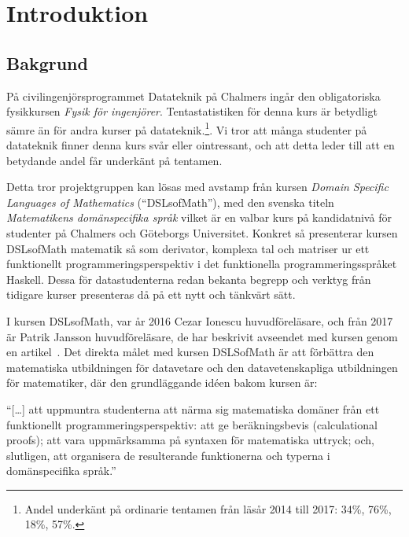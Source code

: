 
\chapter{Introduktion}

\begin{binge}
\end{binge}

\section{Bakgrund}

\begin{draft}

På civilingenjörsprogrammet Datateknik på Chalmers ingår den obligatoriska
fysikkursen \textit{Fysik för ingenjörer}. Tentastatistiken för denna kurs är
betydligt sämre än för andra kurser på datateknik.\footnote{Andel underkänt på
ordinarie tentamen från läsår 2014 till 2017: 34\%, 76\%, 18\%, 57\%.
}\cite{tentastatistik}. Vi tror att många studenter på datateknik finner denna
kurs svår eller ointressant, och att detta leder till att en betydande andel får
underkänt på tentamen.

Detta tror projektgruppen kan lösas med avstamp från kursen \textit{Domain
Specific Languages of Mathematics} (``DSLsofMath''), med den svenska titeln
\textit{Matematikens domänspecifika språk} vilket är en valbar kurs på
kandidatnivå för studenter på Chalmers och Göteborgs Universitet. Konkret så
presenterar kursen DSLsofMath matematik så som derivator, komplexa tal och
matriser ur ett funktionellt programmeringsperspektiv i det funktionella
programmeringsspråket Haskell. Dessa för datastudenterna redan bekanta begrepp
och verktyg från tidigare kurser presenteras då på ett nytt och tänkvärt sätt.

I kursen DSLsofMath, var år 2016 Cezar Ionescu huvudföreläsare, och från
2017 är Patrik Jansson huvudföreläsare, de har beskrivit avseendet med kursen
genom en artikel~\cite{tfpie2015}. Det direkta målet med kursen DSLSofMath är
att förbättra den matematiska utbildningen för datavetare och den
datavetenskapliga utbildningen för matematiker, där den grundläggande idéen
bakom kursen är:

\begin{center} ``[\dots] att uppmuntra studenterna att närma sig matematiska
  domäner från ett funktionellt programmeringsperspektiv: att ge beräkningsbevis
  (calculational proofs); att vara uppmärksamma på syntaxen för matematiska
  uttryck; och, slutligen, att organisera de resulterande funktionerna och
typerna i domänspecifika språk.''\cite{lecture-notes}\cite{tfpie2015}
\end{center}


\end{draft}

